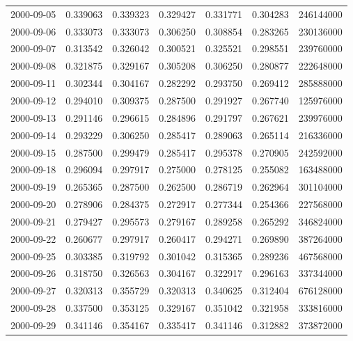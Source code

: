 \begin{tabular}{lrrrrrr}
2000-09-05 &    0.339063 &    0.339323 &    0.329427 &    0.331771 &    0.304283 &   246144000 \\
2000-09-06 &    0.333073 &    0.333073 &    0.306250 &    0.308854 &    0.283265 &   230136000 \\
2000-09-07 &    0.313542 &    0.326042 &    0.300521 &    0.325521 &    0.298551 &   239760000 \\
2000-09-08 &    0.321875 &    0.329167 &    0.305208 &    0.306250 &    0.280877 &   222648000 \\
2000-09-11 &    0.302344 &    0.304167 &    0.282292 &    0.293750 &    0.269412 &   285888000 \\
2000-09-12 &    0.294010 &    0.309375 &    0.287500 &    0.291927 &    0.267740 &   125976000 \\
2000-09-13 &    0.291146 &    0.296615 &    0.284896 &    0.291797 &    0.267621 &   239976000 \\
2000-09-14 &    0.293229 &    0.306250 &    0.285417 &    0.289063 &    0.265114 &   216336000 \\
2000-09-15 &    0.287500 &    0.299479 &    0.285417 &    0.295378 &    0.270905 &   242592000 \\
2000-09-18 &    0.296094 &    0.297917 &    0.275000 &    0.278125 &    0.255082 &   163488000 \\
2000-09-19 &    0.265365 &    0.287500 &    0.262500 &    0.286719 &    0.262964 &   301104000 \\
2000-09-20 &    0.278906 &    0.284375 &    0.272917 &    0.277344 &    0.254366 &   227568000 \\
2000-09-21 &    0.279427 &    0.295573 &    0.279167 &    0.289258 &    0.265292 &   346824000 \\
2000-09-22 &    0.260677 &    0.297917 &    0.260417 &    0.294271 &    0.269890 &   387264000 \\
2000-09-25 &    0.303385 &    0.319792 &    0.301042 &    0.315365 &    0.289236 &   467568000 \\
2000-09-26 &    0.318750 &    0.326563 &    0.304167 &    0.322917 &    0.296163 &   337344000 \\
2000-09-27 &    0.320313 &    0.355729 &    0.320313 &    0.340625 &    0.312404 &   676128000 \\
2000-09-28 &    0.337500 &    0.353125 &    0.329167 &    0.351042 &    0.321958 &   333816000 \\
2000-09-29 &    0.341146 &    0.354167 &    0.335417 &    0.341146 &    0.312882 &   373872000 \\

\end{tabular}
